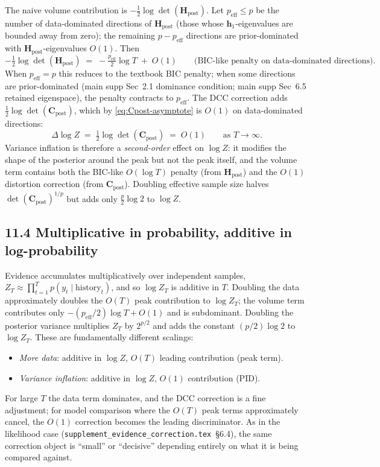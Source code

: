 \documentclass[11pt]{article}
\begin{document}
The naive volume contribution is $-\tfrac{1}{2}\log\det(\mathbf H_{\mathrm{post}})$. Let
$p_{\mathrm{eff}} \le p$ be the number of data-dominated directions of $\mathbf H_{\mathrm{post}}$
(those whose $\mathbf h_1$-eigenvalues are bounded away from zero); the remaining
$p - p_{\mathrm{eff}}$ directions are prior-dominated with $\mathbf H_{\mathrm{post}}$-eigenvalues
$O(1)$. Then
\begin{equation}
-\tfrac{1}{2}\log\det(\mathbf H_{\mathrm{post}})
\;=\;
-\tfrac{p_{\mathrm{eff}}}{2}\log T \;+\; O(1)
\qquad \text{(BIC-like penalty on data-dominated directions)}.
\label{eq:BIC-penalty}
\end{equation}
When $p_{\mathrm{eff}} = p$ this reduces to the textbook BIC penalty; when some directions
are prior-dominated (main supp Sec~2.1 dominance condition; main supp Sec~6.5 retained
eigenspace), the penalty contracts to $p_{\mathrm{eff}}$. The DCC correction adds
$\tfrac{1}{2}\log\det(\mathbf C_{\mathrm{post}})$, which by \eqref{eq:Cpost-asymptote} is
$O(1)$ on data-dominated directions:
\begin{equation}
\Delta\log Z
\;=\;
\tfrac{1}{2}\log\det(\mathbf C_{\mathrm{post}})
\;=\;
O(1)
\qquad \text{as } T\to\infty.
\label{eq:correction-O1}
\end{equation}
Variance inflation is therefore a \emph{second-order} effect on $\log Z$: it modifies the
shape of the posterior around the peak but not the peak itself, and the volume term
contains both the BIC-like $O(\log T)$ penalty (from $\mathbf H_{\mathrm{post}}$) and the
$O(1)$ distortion correction (from $\mathbf C_{\mathrm{post}}$). Doubling effective sample
size halves $\det(\mathbf C_{\mathrm{post}})^{1/p}$ but adds only $\tfrac{p}{2}\log 2$ to
$\log Z$.

\subsection*{11.4 Multiplicative in probability, additive in log-probability}

Evidence accumulates multiplicatively over independent samples,
$Z_T \approx \prod_{t=1}^T p(y_t \mid \mathrm{history}_t)$, and so $\log Z_T$ is additive
in $T$. Doubling the data approximately doubles the $O(T)$ peak contribution to $\log Z_T$;
the volume term contributes only $-(p_{\mathrm{eff}}/2)\log T + O(1)$ and is subdominant.
Doubling the posterior variance multiplies $Z_T$ by $2^{p/2}$ and adds the constant
$(p/2)\log 2$ to $\log Z_T$. These are fundamentally different scalings:
\begin{itemize}
\item \emph{More data}: additive in $\log Z$, $O(T)$ leading contribution (peak term).
\item \emph{Variance inflation}: additive in $\log Z$, $O(1)$ contribution (PID).
\end{itemize}
For large $T$ the data term dominates, and the DCC correction is a fine adjustment; for
model comparison where the $O(T)$ peak terms approximately cancel, the $O(1)$ correction
becomes the leading discriminator. As in the likelihood case
(\texttt{supplement\_evidence\_correction.tex}~\S6.4), the same correction object is
``small'' or ``decisive'' depending entirely on what it is being compared against.
\end{document}
